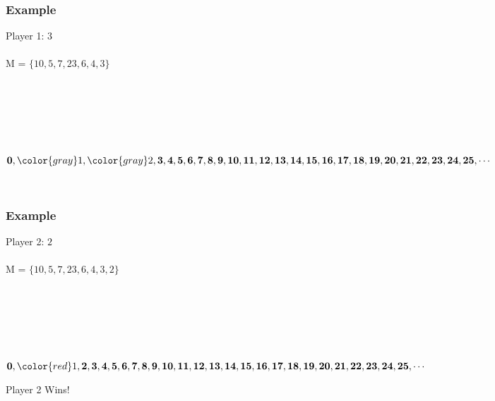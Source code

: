 \documentclass{beamer}
\begin{document}

\begin{frame}
\begin{center}
\frametitle{Example}

Player 1: $3$\\

~\\

M = $\lbrace 10, 5, 7, 23, 6, 4, 3 \rbrace$\\

~\\

~\\

~\\

~\\

~\\

~\\

{\small ${\bf 0}, {\color{gray} 1}, {\color{gray} 2}, {\bf 3}, {\bf 4}, {\bf 5}, {\bf 6}, {\bf 7}, {\bf 8}, {\bf 9}, {\bf 10}, {\bf 11}, {\bf 12}, {\bf 13}, {\bf 14}, {\bf 15}, {\bf 16}, {\bf 17}, {\bf 18}, {\bf 19}, {\bf 20}, {\bf 21}, {\bf 22}, {\bf 23}, {\bf 24}, {\bf 25}, \cdots$\\}

~

\end{center}
\end{frame}


\begin{frame}
\begin{center}
\frametitle{Example}

Player 2: $2$\\

~\\

M = $\lbrace 10, 5, 7, 23, 6, 4, 3, 2 \rbrace$\\

~\\

~\\

~\\

~\\

~\\

~\\

{\small ${\bf 0}, {\color{red} 1}, {\bf 2}, {\bf 3}, {\bf 4}, {\bf 5}, {\bf 6}, {\bf 7}, {\bf 8}, {\bf 9}, {\bf 10}, {\bf 11}, {\bf 12}, {\bf 13}, {\bf 14}, {\bf 15}, {\bf 16}, {\bf 17}, {\bf 18}, {\bf 19}, {\bf 20}, {\bf 21}, {\bf 22}, {\bf 23}, {\bf 24}, {\bf 25}, \cdots$\\}

Player 2 Wins!

\end{center}
\end{frame}
\end{document}
